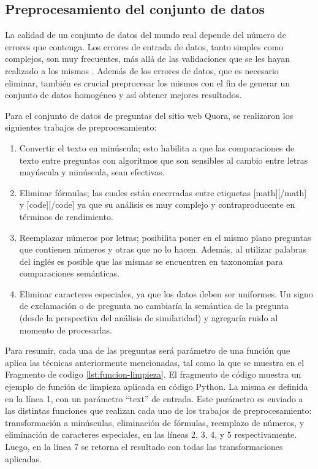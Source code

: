 \subsection{Preprocesamiento del conjunto de datos}

La calidad de un conjunto de datos del mundo real depende del número de errores que contenga. Los errores de entrada de datos, tanto simples como complejos, son muy frecuentes, más allá de las validaciones que se les hayan realizado a los mismos \citep{maletic2000data}. Además de los errores de datos, que es necesario eliminar, también es crucial preprocesar los mismos con el fin de generar un conjunto de datos homogéneo y así obtener mejores resultados.

\bigskip Para el conjunto de datos de preguntas del sitio web Quora, se realizaron los siguientes trabajos de preprocesamiento:

\begin{enumerate}
	\item Convertir el texto en minúscula; esto habilita a que las comparaciones de texto entre preguntas con algoritmos que son sensibles al cambio entre letras mayúscula y minúscula, sean efectivas.
	\item Eliminar fórmulas; las cuales están encerradas entre etiquetas [math][/math] y [code][/code] ya que su análisis es muy complejo y contraproducente en términos de rendimiento.
	\item Reemplazar números por letras; posibilita poner en el mismo plano preguntas que contienen números y otras que no lo hacen. Además, al utilizar palabras del inglés es posible que las mismas se encuentren en taxonomías para comparaciones semánticas.
	\item Eliminar caracteres especiales, ya que los datos deben ser uniformes. Un signo de exclamación o de pregunta no cambiaría la semántica de la pregunta (desde la perspectiva del análisis de similaridad) y agregaría ruido al momento de procesarlas.
\end{enumerate}

Para resumir, cada una de las preguntas será parámetro de una función que aplica las técnicas anteriormente mencionadas, tal como la que se muestra en el Fragmento de codigo \ref{lst:funcion-limpieza}. El fragmento de código muestra un ejemplo de función de limpieza aplicada en código Python. La misma es definida en la línea 1, con un parámetro “text” de entrada. Este parámetro es enviado a las distintas funciones que realizan cada uno de los trabajos de preprocesamiento: transformación a minúsculas, eliminación de fórmulas, reemplazo de números, y eliminación de caracteres especiales, en las líneas 2, 3, 4, y 5 respectivamente. Luego, en la línea 7 se retorna el resultado con todas las transformaciones aplicadas.

